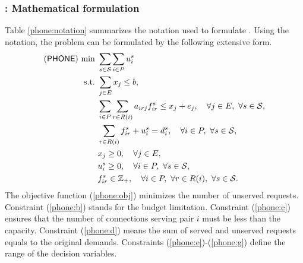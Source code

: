 \subsubsection{\phone: Mathematical formulation}
Table \ref{phone:notation} summarizes the notation used to formulate \phone. Using the notation, the problem can be formulated by the following extensive form.
\begin{subequations} \label{phone:formulation}
	\begin{align}
	(\phone)\ \textrm{min}\ &\sum_{s\in\mathcal{S}}\sum_{i\in P}u_i^s \label{phone:obj}\\
	\textrm{s.t.}\ &\sum_{j\in E} x_j \le b, \label{phone:b} \\
	&\sum_{i\in P} \sum_{r\in R(i)} a_{irj}f_{ir}^s\le x_j+e_j,\quad\forall j\in E,\ \forall s\in\mathcal{S},\label{phone:c}\\
	&\sum_{r\in R(i)}f_{ir}^s+u_i^s = d_i^s,\quad\forall i\in P,\ \forall s\in\mathcal{S}, \label{phone:d}\\
	&x_j\ge 0,\quad\forall j\in E, \label{phone:e}\\
	&u_{i}^s\ge 0,\quad\forall i\in P,\ \forall s\in\mathcal{S}, \label{phone:f}\\
	&f_{ir}^s\in\mathbb{Z}_+,\quad\forall i\in P,\ \forall r\in R(i),\ \forall s\in\mathcal{S}. \label{phone:g}
	\end{align}
\end{subequations}
The objective function (\ref{phone:obj}) minimizes the number of unserved requests. Constraint (\ref{phone:b}) stands for the budget limitation. Constraint (\ref{phone:c}) ensures that the number of connections serving pair $i$ must be less than the capacity. Constraint (\ref{phone:d}) means the sum of served and unserved requests equals to the original demands. Constraints (\ref{phone:e})-(\ref{phone:g}) define the range of the decision variables. 
